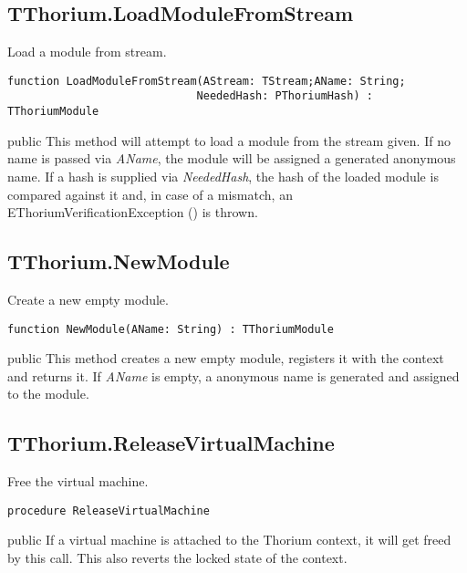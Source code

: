 \subsection{TThorium.LoadModuleFromStream}
\label{thoriumcorepkg:thorium:tthorium:loadmodulefromstream}
\begin{FPCList}
\Synopsis
Load a module from stream.\Declaration 

\begin{verbatim}
function LoadModuleFromStream(AStream: TStream;AName: String;
                             NeededHash: PThoriumHash) : TThoriumModule
\end{verbatim}
\Visibility
public
\Description
This method will attempt to load a module from the stream given. If no name is passed via \textit{AName}, the module will be assigned a generated anonymous name. If a hash is supplied via \textit{NeededHash}, the hash of the loaded module is compared against it and, in case of a mismatch, an EThoriumVerificationException (\pageref{thoriumcorepkg:thorium:ethoriumverificationexception}) is thrown.\end{FPCList}
\subsection{TThorium.NewModule}
\label{thoriumcorepkg:thorium:tthorium:newmodule}
\begin{FPCList}
\Synopsis
Create a new empty module.\Declaration 

\begin{verbatim}
function NewModule(AName: String) : TThoriumModule
\end{verbatim}
\Visibility
public
\Description
This method creates a new empty module, registers it with the context and returns it. If \textit{AName} is empty, a anonymous name is generated and assigned to the module.\end{FPCList}
\subsection{TThorium.ReleaseVirtualMachine}
\label{thoriumcorepkg:thorium:tthorium:releasevirtualmachine}
\begin{FPCList}
\Synopsis
Free the virtual machine.\Declaration 

\begin{verbatim}
procedure ReleaseVirtualMachine
\end{verbatim}
\Visibility
public
\Description
If a virtual machine is attached to the Thorium context, it will get freed by this call. This also reverts the locked state of the context.\end{FPCList}
